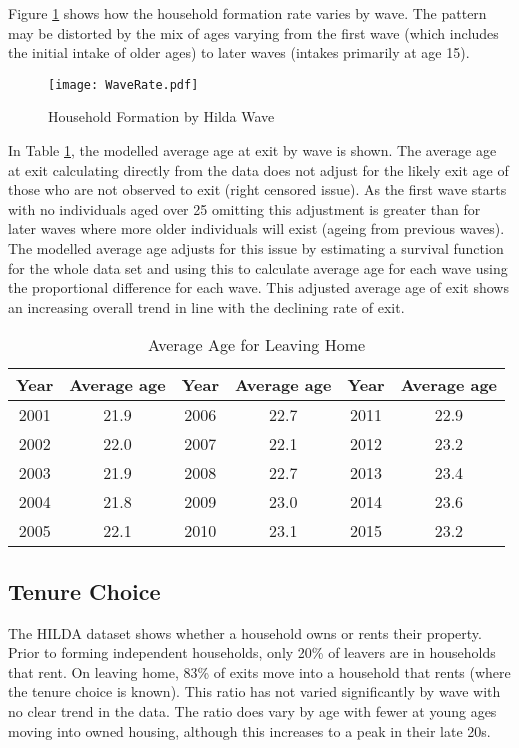 \documentclass[12pt]{article}
\begin{document}
Figure \ref{ExitbyWave} shows how the household formation rate varies by wave. The pattern may be distorted by the mix of ages varying from the first wave (which includes the initial intake of older ages) to later waves (intakes primarily at age 15).

\begin{figure}[htpb]
  \caption{Household Formation by Hilda Wave}
  \label{ExitbyWave}
  \centering
  \texttt{[image: WaveRate.pdf]}
\end{figure}

In Table \ref{rate1}, the modelled average age at exit by wave is shown. The average age at exit calculating directly from the data does not adjust for the likely exit age of those who are not observed to exit (right censored issue). As the first wave starts with no individuals aged over 25 omitting this adjustment is greater than for later waves where more older individuals will exist (ageing from previous waves). The modelled average age adjusts for this issue by estimating a survival function for the whole data set and using this to calculate average age for each wave using the proportional difference for each wave. This adjusted average age of exit shows an increasing overall trend in line with the declining rate of exit.

\begin{table}[htpb]
  \centering
  \caption{Average Age for Leaving Home}
  \label{rate1}
\begin{tabular}{@{}cccccc@{}}
\toprule
Year & Average age & Year & Average age & Year & Average age\tabularnewline
\midrule
2001 & 21.9 & 2006 & 22.7 & 2011 & 22.9 \tabularnewline
2002 & 22.0 & 2007 & 22.1 & 2012 & 23.2 \tabularnewline
2003 & 21.9 & 2008 & 22.7 & 2013 & 23.4 \tabularnewline
2004 & 21.8 & 2009 & 23.0 & 2014 & 23.6 \tabularnewline
2005 & 22.1 & 2010 & 23.1 & 2015 & 23.2 \tabularnewline
\bottomrule
\end{tabular}
\end{table}


\subsection{Tenure Choice}
The HILDA dataset shows whether a household owns or rents their property. Prior to forming independent households, only 20\% of leavers are in households that rent.  On leaving home, 83\% of exits move into a household that rents (where the tenure choice is known). This ratio has not varied significantly by wave with no clear trend in the data. The ratio does vary by age with fewer at young ages moving into owned housing, although this increases to a peak in their late 20s.
\end{document}
